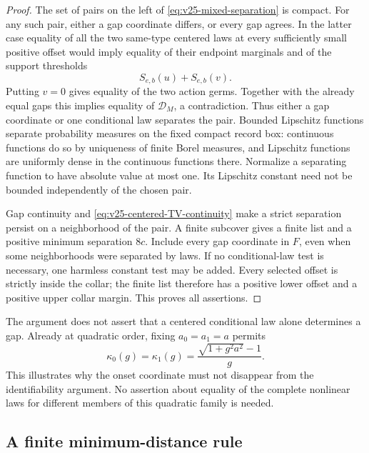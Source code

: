 \begin{proof}
The set of pairs on the left of \eqref{eq:v25-mixed-separation} is compact.
For any such pair, either a gap coordinate differs, or every gap agrees.
In the latter case equality of all the two same-type centered laws at every
sufficiently small positive offset would imply equality of their endpoint
marginals and of the support thresholds
\[
                         S_{e,b}(u)+S_{e,b}(v).
\]
Putting \(v=0\) gives equality of the two action germs.  Together with the
already equal gaps this implies equality of \(\mathcal D_M\), a
contradiction.  Thus either a gap coordinate or one conditional law separates
the pair.  Bounded Lipschitz functions separate probability measures on the
fixed compact record box: continuous functions do so by uniqueness of finite
Borel measures, and Lipschitz functions are uniformly dense in the continuous
functions there.  Normalize a separating function to have absolute value at
most one.  Its Lipschitz constant need not be bounded independently of the
chosen pair.

Gap continuity and \eqref{eq:v25-centered-TV-continuity} make a strict
separation persist on a neighborhood of the pair.  A finite subcover gives
a finite list and a positive minimum separation \(8c\).  Include every gap
coordinate in \(F\), even when some neighborhoods were separated by laws.
If no conditional-law test is necessary, one harmless constant test may be
added.  Every selected offset is strictly inside the collar; the finite list
therefore has a positive lower offset and a positive upper collar margin.
This proves all assertions.
\end{proof}

The argument does not assert that a centered conditional law alone determines
a gap.  Already at quadratic order, fixing \(a_0=a_1=a\) permits
\[
       \kappa_0(g)=\kappa_1(g)
                    =\frac{\sqrt{1+g^2a^2}-1}{g}.
\]
This illustrates why the onset coordinate must not disappear from the
identifiability argument.  No assertion about equality of the complete
nonlinear laws for different members of this quadratic family is needed.

\subsection{A finite minimum-distance rule}

